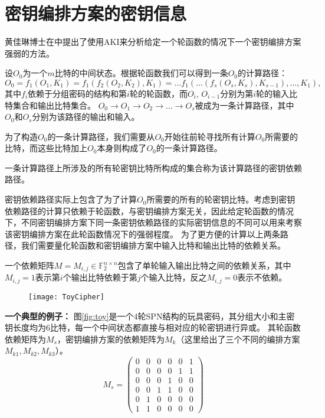 \section{密钥编排方案的密钥信息}
黄佳琳博士在\cite{huang2014revisiting}中提出了使用AKI来分析给定一个轮函数的情况下一个密钥编排方案强弱的方法。
\begin{defn}[计算路径]
    设$O_0$为一个$m$比特的中间状态。根据轮函数我们可以得到一条$O_0$的计算路径：
    $$O_0=f_1(O_1,K_1)=f_1(f_2(O_2,K_2),K_1)=\dots f_1(\dots(f_s(O_s,K_s),K_{s-1}),\dots,K_1),$$
    其中$f_i$依赖于分组密码的结构和第$i$轮的轮函数，而$O_i$, $O_{i-1}$分别为第$i$轮的输入比特集合和输出比特集合。
    $O_0\rightarrow O_1\rightarrow O_2\rightarrow\dots\rightarrow O_s$被成为一条计算路径，其中$O_0$和$O_s$分别为该路径的输出和输入。
\end{defn}
为了构造$O_0$的一条计算路径，我们需要从$O_0$开始往前轮寻找所有计算$O_0$所需要的比特，而这些比特加上$O_0$本身则构成了$O_0$的一条计算路径。
\begin{defn}[密钥依赖路径]
    一条计算路径上所涉及的所有轮密钥比特所构成的集合称为该计算路径的密钥依赖路径。
\end{defn}
密钥依赖路径实际上包含了为了计算$O_0$所需要的所有的轮密钥比特。考虑到密钥依赖路径的计算只依赖于轮函数，与密钥编排方案无关，因此给定轮函数的情况下，不同密钥编排方案下同一条密钥依赖路径的实际密钥信息的不同可以用来考察该密钥编排方案在此轮函数情况下的强弱程度。
为了更方便的计算以上两条路径，我们需要量化轮函数和密钥编排方案中输入比特和输出比特的依赖关系。
\begin{defn}[依赖矩阵]
    一个依赖矩阵$M=M_{i,j}\in\mathbb{F}^{n\times n}_2$包含了单轮输入输出比特之间的依赖关系，其中$M_{i,j}=1$表示第$i$个输出比特依赖于第$j$个输入比特，反之$M_{i,j}=0$表示不依赖。
\end{defn}
\begin{figure}[htbp]
\centering
    \texttt{[image: ToyCipher]}
\end{figure}
\textbf{一个典型的例子：}
图\ref{fig:toy}是一个4轮SPN结构的玩具密码，其分组大小和主密钥长度均为6比特，每一个中间状态都直接与相对应的轮密钥进行异或。
其轮函数依赖矩阵为$M_s$，密钥编排方案的依赖矩阵为$M_k$（这里给出了三个不同的编排方案$M_{k1},M_{k2},M_{k3}$）。
$$M_s=\left(
    \begin{array}{cccccc}
        0&0&0&0&0&1\\
        0&0&0&0&1&1\\
        0&0&0&1&0&0\\
        0&0&1&1&0&0\\
        0&1&0&0&0&0\\
        1&1&0&0&0&0
    \end{array}
\right)$$
